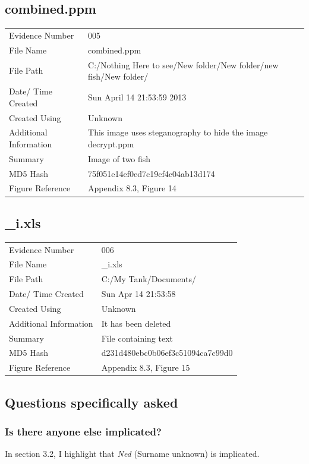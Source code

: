 \documentclass[12pt]{article}
\begin{document}
				\subsection{combined.ppm}
					\begin{tabular}{l | p{8cm}}
						Evidence Number & 005  \\
			    			File Name & combined.ppm \\
			      			File Path & C:/Nothing Here to see/New folder/New folder/new fish/New folder/\\
						Date/ Time Created & Sun April 14 21:53:59 2013\\
						Created Using & Unknown \\
						Additional Information & This image uses steganography to hide the image decrypt.ppm\\
						Summary & Image of two fish\\
						MD5 Hash & 75f051e14ef0ed7c19cf4c04ab13d174 \\
						Figure Reference & Appendix 8.3, Figure 14\\
					\end{tabular}
					
				\subsection{\_i.xls}
					\begin{tabular}{l | p{8cm}}
						Evidence Number & 006  \\
			    			File Name & \_i.xls \\
			      			File Path & C:/My Tank/Documents/ \\
						Date/ Time Created & Sun Apr 14 21:53:58 \\
						Created Using & Unknown \\
						Additional Information & It has been deleted \\
						Summary & File containing text \\
						MD5 Hash & d231d480ebc0b06ef3c51094ca7c99d0 \\
						Figure Reference & Appendix 8.3, Figure 15\\
					\end{tabular}

				\subsection{Questions specifically asked}

					\subsubsection{Is there anyone else implicated?}
						In section 3.2, I highlight that \textit{Ned} (Surname unknown) is implicated.
\end{document}
